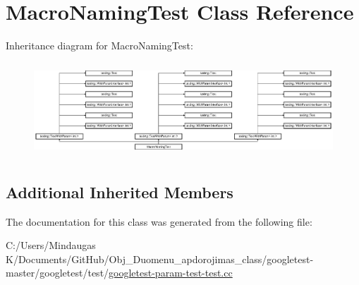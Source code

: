 \hypertarget{class_macro_naming_test}{}\section{Macro\+Naming\+Test Class Reference}
\label{class_macro_naming_test}
Inheritance diagram for Macro\+Naming\+Test\+:\begin{figure}[H]
\begin{center}
\leavevmode
\includegraphics[height=3.572568cm]{dd/df9/class_macro_naming_test}
\end{center}
\end{figure}
\subsection*{Additional Inherited Members}


The documentation for this class was generated from the following file\+:\begin{DoxyCompactItemize}
\item 
C\+:/\+Users/\+Mindaugas K/\+Documents/\+Git\+Hub/\+Obj\+\_\+\+Duomenu\+\_\+apdorojimas\+\_\+class/googletest-\/master/googletest/test/\mbox{\hyperlink{googletest-master_2googletest_2test_2googletest-param-test-test_8cc}{googletest-\/param-\/test-\/test.\+cc}}\end{DoxyCompactItemize}
